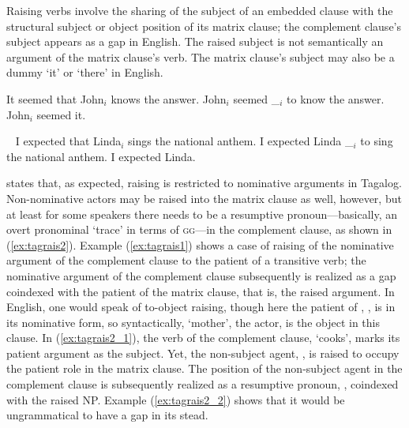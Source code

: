 Raising verbs involve the sharing of the subject of an embedded clause with the
structural subject or object position of its matrix clause; the complement
clause's subject appears as a gap in English. The raised subject is not
semantically an argument of the matrix clause's verb. The matrix clause's
subject may also be a dummy `it' or `there' in English.

\pex\label{ex:engrais}
\a It seemed that John$_i$ knows the answer.
\a John$_i$ seemed \_$_i$ to know the answer.
\a \ljudge* John$_i$ seemed it.
\xe

\pex~\label{ex:engrais2}
\a I expected that Linda$_i$ sings the national anthem.
\a I expected Linda \_$_i$ to sing the national anthem.
\a \ljudge\excl I expected Linda.
\xe

\citet[27--28]{kroeger1991} states that, as expected, raising is restricted to
nominative arguments in Tagalog. Non-nominative actors may be raised into the
matrix clause as well, however, but at least for some speakers there needs to
be a resumptive pronoun---basically, an overt pronominal `trace' in terms of
\textsc{gg}---in the complement clause, as shown in (\ref{ex:tagrais2}).
Example (\ref{ex:tagrais1}) shows a case of raising of the nominative argument
of the complement clause to the patient of a transitive verb; the nominative
argument of the complement clause subsequently is realized as a gap coindexed
with the patient of the matrix clause, that is, the raised argument. In
English, one would speak of to-object raising, though here the patient of
, , is in its nominative form, so syntactically,  `mother', the actor, is the object in this clause. In
(\ref{ex:tagrais2_1}), the verb of the complement clause,  `cooks',
marks its patient argument as the subject. Yet, the non-subject agent,
, is raised to occupy the patient role in the matrix clause. The
position of the non-subject agent in the complement clause is subsequently
realized as a resumptive pronoun, , coindexed with the raised NP.
Example (\ref{ex:tagrais2_2}) shows that it would be ungrammatical to have a
gap in its stead.

